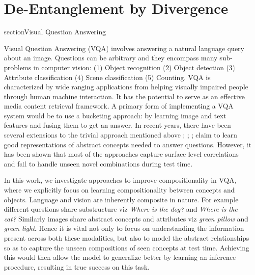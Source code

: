 \chapter{De-Entanglement by Divergence}

section{Visual Question Answering}

Visual Question Answering (VQA) involves answering a natural language query about an image. Questions can be arbitrary and they encompass many sub-problems in computer vision: (1) Object recognition %
(2) Object detection %
(3) Attribute classification %
(4) Scene classification %
(5) Counting. %
VQA is characterized by wide ranging applications from helping visually impaired people through human machine interaction. It has the potential to serve as an effective media content retrieval framework. 
A primary form of implementing a VQA system would be to use a bucketing approach: by learning image and text features and fusing them to get an answer. In recent years, there have been several extensions to the trivial approach mentioned above \cite{fukui2016multimodal}; \cite{lu2016hierarchical}; \cite{yang2016stacked}; \cite{lu2015deeper} claim to learn good representations of abstract concepts needed to answer questions. However, it has been shown \cite{agrawal2017c} that most of the approaches capture surface level correlations and fail to handle unseen novel combinations during test time. 

In this work, we investigate approaches to improve compositionality in VQA, where we explicitly focus on learning compositionality between concepts and objects. Language and vision are inherently composite in nature. For example different questions share substructure viz \textit{Where is the dog?} and \textit{Where is the cat?} Similarly images share abstract concepts and attributes viz \textit{green pillow} and \textit{green light}. Hence it is vital not only to focus on understanding the information present across both these modalities, but also to model the abstract relationships so as to capture the unseen compositions of seen concepts at test time. Achieving this would then allow the model to generalize better by learning an inference procedure, resulting in true success on this task.

